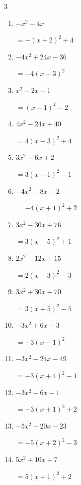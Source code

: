 \begin{multicols}{3}
\begin{enumerate}
        $=-\left( x+5\right)^{2}+4$

  \item $-x^{2}-4x$

        $=-\left( x+2\right)^{2}+4$

  \item $-4x^{2}+24x-36$

        $=-4\left( x-3\right)^{2}$

  \item $x^{2}-2x-1$

        $=\left( x-1\right)^{2}-2$

  \item $4x^{2}-24x+40$

        $=4\left( x-3\right)^{2}+4$

  \item $3x^{2}-6x+2$

        $=3\left( x-1\right)^{2}-1$

  \item $-4x^{2}-8x-2$

        $=-4\left( x+1\right)^{2}+2$

\columnbreak %

  \item $3x^{2}-30x+76$

        $=3\left( x-5\right)^{2}+1$

  \item $2x^{2}-12x+15$

        $=2\left( x-3\right)^{2}-3$

  \item $3x^{2}+30x+70$

        $=3\left( x+5\right)^{2}-5$

  \item $-3x^{2}+6x-3$

        $=-3\left( x-1\right)^{2}$

  \item $-3x^{2}-24x-49$

        $=-3\left( x+4\right)^{2}-1$

  \item $-3x^{2}-6x-1$

        $=-3\left( x+1\right)^{2}+2$

  \item $-5x^{2}-20x-23$

        $=-5\left( x+2\right)^{2}-3$

  \item $5x^{2}+10x+7$

        $=5\left( x+1\right)^{2}+2$


\end{enumerate}
\end{multicols}
